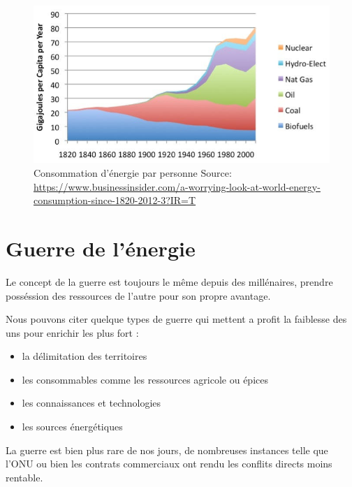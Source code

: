 \begin{figure}
  \centering
  \includegraphics[scale=0.35]{media/world_per_capita_energy.jpeg}
  \caption{
      Consommation d'énergie par personne\newline
      \tiny{Source:\newline
        \url{https://www.businessinsider.com/a-worrying-look-at-world-energy-consumption-since-1820-2012-3?IR=T}
      }
  }
  \label{fig:capita_energy}
\end{figure}


\section{Guerre de l'énergie}

Le concept de la guerre est toujours le même depuis des millénaires, prendre posséssion des
ressources de l'autre pour son propre avantage.

Nous pouvons citer quelque types de guerre qui mettent a profit la faiblesse des uns
pour enrichir les plus fort :

\begin{itemize}
  \item la délimitation des territoires %
  \item les consommables comme les ressources agricole ou épices
  \item les connaissances et technologies
  \item les sources énergétiques
\end{itemize}

La guerre est bien plus rare de nos jours, de nombreuses instances telle que l'ONU ou bien les
contrats commerciaux ont rendu les conflits directs moins rentable.

